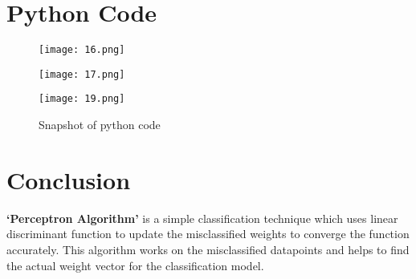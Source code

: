 \documentclass[conference]{IEEEtran}
\begin{document}
\section{Python Code}
\begin{figure}[htbp]
\centerline{\texttt{[image: 16.png]}}
\centerline{\texttt{[image: 17.png]}}
\centerline{\texttt{[image: 19.png]}}

\caption{Snapshot of python code}
\label{fig}
\end{figure}


\section{Conclusion}

\textbf{‘Perceptron Algorithm’} is a simple classification technique which uses linear discriminant function to update the misclassified weights to converge the function accurately. This algorithm works on the misclassified datapoints and helps to find the actual weight vector for the classification model.
\end{document}
